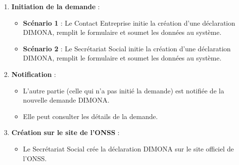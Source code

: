 \begin{enumerate}
  \item \textbf{Initiation de la demande} :
    \begin{itemize}[leftmargin=*,label=\textcolor{darkgray}{$\bullet$},itemsep=0.3em]
      \item \textbf{Scénario 1} : Le Contact Entreprise initie la création d'une déclaration DIMONA, remplit le formulaire et soumet les données au système.
      \item \textbf{Scénario 2} : Le Secrétariat Social initie la création d'une déclaration DIMONA, remplit le formulaire et soumet les données au système.
    \end{itemize}

  \item \textbf{Notification} :
    \begin{itemize}[leftmargin=*,label=\textcolor{darkgray}{$\bullet$},itemsep=0.3em]
      \item L'autre partie (celle qui n'a pas initié la demande) est notifiée de la nouvelle demande DIMONA.
      \item Elle peut consulter les détails de la demande.
    \end{itemize}

  \item \textbf{Création sur le site de l'ONSS} :
    \begin{itemize}[leftmargin=*,label=\textcolor{darkgray}{$\bullet$},itemsep=0.3em]
      \item Le Secrétariat Social crée la déclaration DIMONA sur le site officiel de l'ONSS.
    \end{itemize}


\end{enumerate}
